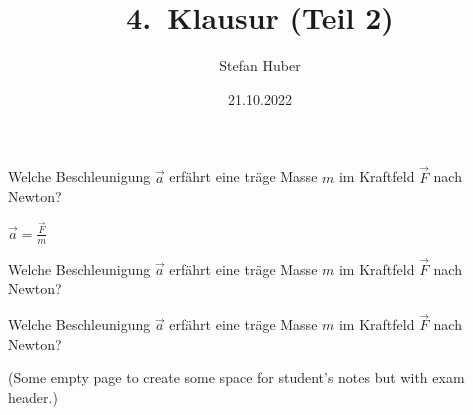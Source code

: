 \documentclass[ngerman,twoside,exam,showanswers]{exsheet2}
\title{4.\ Klausur (Teil 2)}
\date{21.10.2022}
\author{Stefan Huber}
\institute{Department IT}
\begin{document}
\maketitle


\begin{exercise}[6]
  Welche Beschleunigung $\vec{a}$ erfährt eine träge Masse $m$ im Kraftfeld
  $\vec{F}$ nach Newton?
  \vspace{2cm}
\end{exercise}


\begin{answer}
  $\vec{a} = \frac{\vec{F}}{m}$
\end{answer}


\begin{exercise}[3]
  Welche Beschleunigung $\vec{a}$ erfährt eine träge Masse $m$ im Kraftfeld
  $\vec{F}$ nach Newton?
  \vspace{2cm}
\end{exercise}


\begin{exercise}[1]
  Welche Beschleunigung $\vec{a}$ erfährt eine träge Masse $m$ im Kraftfeld
  $\vec{F}$ nach Newton?
  \vspace{2cm}
\end{exercise}


\newpage\null
(Some empty page to create some space for student's notes but with exam header.)
\newpage\null
\end{document}
